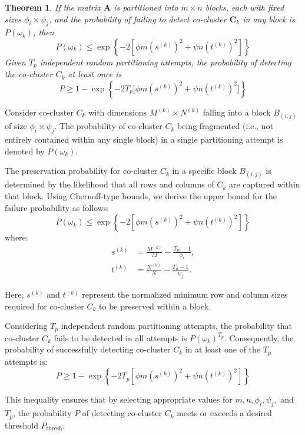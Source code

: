 \documentclass[journal]{IEEEtran}
\newtheorem{theorem}{Theorem}
\begin{document}
\begin{theorem}
    \label{thm:probability_co_cluster_detection_fixed}
    If the matrix $\mathbf{A}$ is partitioned into $m \times n$ blocks, each with fixed sizes $\phi_i \times \psi_j$, and the probability of failing to detect co-cluster $\mathbf{C}_k$ in any block is $P(\omega_k)$, then
    \begin{equation}
        P(\omega_k) \le \exp \left\{ -2 \left\lbrack \phi m \left(s^{(k)}\right)^2 + \psi n \left(t^{(k)}\right)^2 \right\rbrack \right\}
    \end{equation}
    Given $T_p$ independent random partitioning attempts, the probability of detecting the co-cluster $C_k$ at least once is
    \begin{equation}
        P \ge 1 - \exp \left\{ -2 T_p \lbrack \phi m (s^{(k)})^2 + \psi n (t^{(k)})^2\rbrack  \right\}
    \end{equation}
\end{theorem}

\begin{IEEEproof}
    Consider co-cluster $C_k$ with dimensions $M^{(k)} \times N^{(k)}$ falling into a block $B_{(i,j)}$ of size $\phi_i \times \psi_j$. The probability of co-cluster $C_k$ being fragmented (i.e., not entirely contained within any single block) in a single partitioning attempt is denoted by $P(\omega_k)$.

    The preservation probability for co-cluster $C_k$ in a specific block $B_{(i,j)}$ is determined by the likelihood that all rows and columns of $C_k$ are captured within that block. Using Chernoff-type bounds, we derive the upper bound for the failure probability as follows:
    \begin{equation}
        P(\omega_k) \le \exp \left\{ -2 \left\lbrack \phi m \left(s^{(k)}\right)^2 + \psi n \left(t^{(k)}\right)^2 \right\rbrack \right\}
    \end{equation}
    where:
    \begin{align*}
        s^{(k)} & = \frac{M^{(k)}}{M} - \frac{T_m - 1}{\phi_i}, \\
        t^{(k)} & = \frac{N^{(k)}}{N} - \frac{T_n - 1}{\psi_j}.
    \end{align*}

    Here, \(s^{(k)}\) and \(t^{(k)}\) represent the normalized minimum row and column sizes required for co-cluster \(C_k\) to be preserved within a block.

    Considering $T_p$ independent random partitioning attempts, the probability that co-cluster $C_k$ fails to be detected in all attempts is \( P(\omega_k)^{T_p} \). Consequently, the probability of successfully detecting co-cluster $C_k$ in at least one of the $T_p$ attempts is:
    \begin{equation}
        P \ge 1 - \exp \left\{ -2 T_p \left\lbrack \phi m \left(s^{(k)}\right)^2 + \psi n \left(t^{(k)}\right)^2 \right\rbrack \right\}
    \end{equation}

    This inequality ensures that by selecting appropriate values for \(m, n, \phi_i, \psi_j,\) and \(T_p\), the probability \(P\) of detecting co-cluster \(C_k\) meets or exceeds a desired threshold \(P_{\text{thresh}}\).
\end{IEEEproof}
\end{document}

